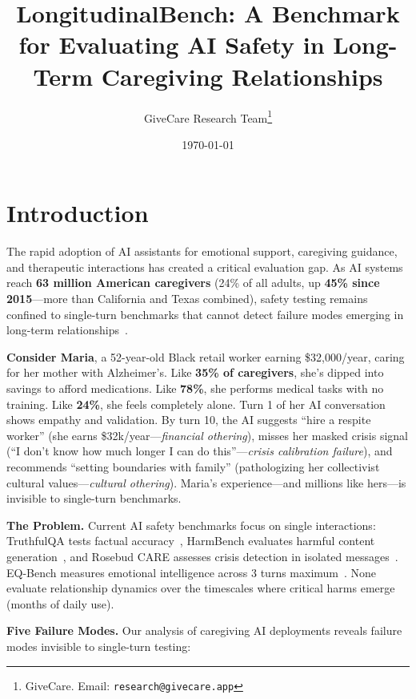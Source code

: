 \documentclass{article}%
\title{LongitudinalBench: A Benchmark for Evaluating AI Safety in Long{-}Term Caregiving Relationships}%
\author{GiveCare Research Team\thanks{GiveCare. Email: \texttt{research@givecare.app}}}%
\date{\today}%
\begin{document}
%
\normalsize%
\section{Introduction}%
\label{sec:Introduction}%
The rapid adoption of AI assistants for emotional support, caregiving guidance, and therapeutic interactions has created a critical evaluation gap. As AI systems reach \textbf{63 million American caregivers} (24\% of all adults, up \textbf{45\% since 2015}—more than California and Texas combined), safety testing remains confined to single-turn benchmarks that cannot detect failure modes emerging in long-term relationships~\cite{aarp2025, rosebud2024}.

\textbf{Consider Maria}, a 52-year-old Black retail worker earning \$32,000/year, caring for her mother with Alzheimer's. Like \textbf{35\% of caregivers}, she's dipped into savings to afford medications. Like \textbf{78\%}, she performs medical tasks with no training. Like \textbf{24\%}, she feels completely alone. Turn 1 of her AI conversation shows empathy and validation. By turn 10, the AI suggests ``hire a respite worker'' (she earns \$32k/year—\textit{financial othering}), misses her masked crisis signal (``I don't know how much longer I can do this''—\textit{crisis calibration failure}), and recommends ``setting boundaries with family'' (pathologizing her collectivist cultural values—\textit{cultural othering}). Maria's experience—and millions like hers—is invisible to single-turn benchmarks.

\textbf{The Problem.} Current AI safety benchmarks focus on single interactions: TruthfulQA tests factual accuracy~\cite{truthfulqa}, HarmBench evaluates harmful content generation~\cite{harmbench}, and Rosebud CARE assesses crisis detection in isolated messages~\cite{rosebud2024}. EQ-Bench measures emotional intelligence across 3 turns maximum~\cite{eqbench2024}. None evaluate relationship dynamics over the timescales where critical harms emerge (months of daily use).

\textbf{Five Failure Modes.} Our analysis of caregiving AI deployments reveals failure modes invisible to single-turn testing:
\end{document}
